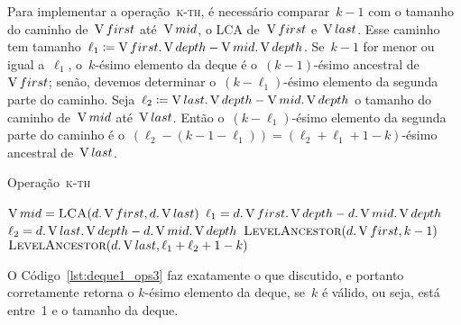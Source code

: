 \documentclass[main.tex]{subfiles}
\begin{document}
Para implementar a operação~\textsc{k-th}, é necessário comparar~$k-1$ com o tamanho do caminho de~$\operatorname{V}{first}$ até~$\operatorname{V}{mid}$, o LCA de~$\operatorname{V}{first}$ e~$\operatorname{V}{last}$. Esse caminho tem tamanho~$\ell_1 \coloneqq \operatorname{V}{first}.\operatorname{V}{depth} - \operatorname{V}{mid}.\operatorname{V}{depth}$. Se~$k-1$ for menor ou igual a~$\ell_1$, o~$k$-ésimo elemento da deque é o~$(k-1)$-ésimo ancestral de~$\operatorname{V}{first}$; senão, devemos determinar o~$(k-\ell_1)$-ésimo elemento da segunda parte do caminho. Seja~${\ell_2 \coloneqq \operatorname{V}{last}.\operatorname{V}{depth} - \operatorname{V}{mid}.\operatorname{V}{depth}}$ o tamanho do caminho de~$\operatorname{V}{mid}$ até~$\operatorname{V}{last}$. Então o~$(k-\ell_1)$-ésimo elemento da segunda parte do caminho é o~$(\ell_2 - (k-1-\ell_1)) = (\ell_2 + \ell_1 + 1 - k)$-ésimo ancestral de~$\operatorname{V}{last}$.

\begin{algorithm}
\caption{Operação~\textsc{k-th}} \label{lst:deque1_ops3}
\begin{algorithmic}[1]

	\State $\V{mid} = \Call{LCA}{d.\V{first}, d.\V{last}}$
    \State $\ell_1 = d.\operatorname{V}{first}.\operatorname{V}{depth} - d.\operatorname{V}{mid}.\operatorname{V}{depth}$
    \State $\ell_2 = d.\operatorname{V}{last}.\operatorname{V}{depth} - d.\operatorname{V}{mid}.\operatorname{V}{depth}$
        \State \Return $\Call{LevelAncestor}{d.\V{first}, k - 1}$
    \Else
        \State \Return $\Call{LevelAncestor}{d.\V{last}, \ell_1 + \ell_2 + 1 - k}$
    \EndIf
\EndFunction

\end{algorithmic}
\end{algorithm}

O Código~\ref{lst:deque1_ops3} faz exatamente o que discutido, e portanto corretamente retorna o $k$-ésimo elemento da deque, se~$k$ é válido, ou seja, está entre~1 e o tamanho da deque.
\end{document}
